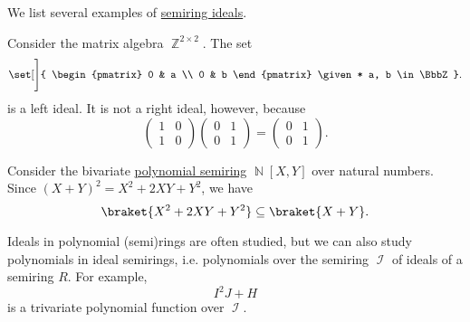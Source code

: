 \begin{example}\label{ex:def:semiring_ideal}
  We list several examples of \hyperref[def:semiring_ideal]{semiring ideals}.
  \begin{thmenum}
     Consider the matrix algebra \( \BbbZ^{2 \times 2} \). The set
    \begin{equation*}
      \set[\Bigg]
      {
        \begin{pmatrix}
          0 & a \\
          0 & b
        \end{pmatrix}
        \given*
        a, b \in \BbbZ
      }.
    \end{equation*}
    is a left ideal. It is not a right ideal, however, because
    \begin{equation*}
      \begin{pmatrix}
        1 & 0 \\
        1 & 0
      \end{pmatrix}
      \begin{pmatrix}
        0 & 1 \\
        0 & 1
      \end{pmatrix}
      =
      \begin{pmatrix}
        0 & 1 \\
        0 & 1
      \end{pmatrix}.
    \end{equation*}

     Consider the bivariate \hyperref[def:polynomial_semiring]{polynomial semiring} \( \BbbN[X, Y] \) over natural numbers. Since \( (X + Y)^2 = X^2 + 2XY + Y^2 \), we have
    \begin{equation*}
      \braket{ X^2 + 2XY + Y^2 } \subseteq \braket{ X + Y }.
    \end{equation*}

     Ideals in polynomial (semi)rings are often studied, but we can also study polynomials in ideal semirings, i.e. polynomials over the semiring \( \mscrI \) of ideals of a semiring \( R \). For example,
    \begin{equation*}
      I^2 J + H
    \end{equation*}
    is a trivariate polynomial function over \( \mscrI \).
  \end{thmenum}
\end{example}

